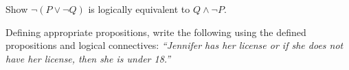 \documentclass[11pt,letterpaper]{article}
\begin{document}
\newpage



 Show $\neg (P \vee \neg Q)$ is logically equivalent to $Q \wedge \neg P$. 



\newpage



 Defining appropriate propositions, write the following using the defined propositions and logical connectives: {\itshape ``Jennifer has her license or if she does not have her license, then she is under 18.''}
\end{document}

